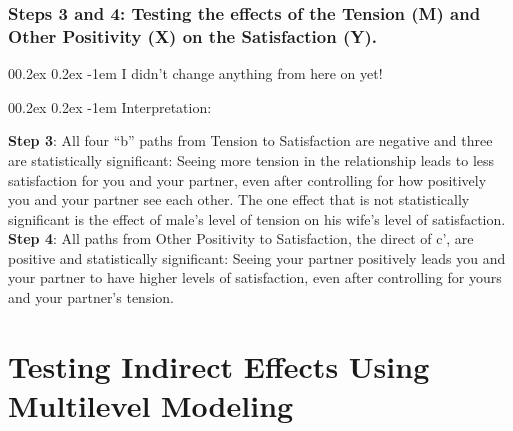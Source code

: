 \documentclass[
  english,
  man,floatsintext]{apa6}
\makeatletter
\let\oldparagraph\paragraph
\renewcommand{\paragraph}[1]{\oldparagraph{#1}\mbox{}}
\renewcommand{\paragraph}{\@startsection{paragraph}{4}{\parindent}%
  {0\baselineskip \@plus 0.2ex \@minus 0.2ex}%
  {-1em}%
  {\normalfont\normalsize\bfseries\itshape\typesectitle}}
\makeatother
\begin{document}
\hypertarget{steps-3-and-4-testing-the-effects-of-the-tension-m-and-other-positivity-x-on-the-satisfaction-y.}{%
\subsubsection{Steps 3 and 4: Testing the effects of the Tension (M) and Other Positivity (X) on the Satisfaction (Y).}\label{steps-3-and-4-testing-the-effects-of-the-tension-m-and-other-positivity-x-on-the-satisfaction-y.}}

\hypertarget{i-didnt-change-anything-from-here-on-yet}{%
\paragraph{I didn't change anything from here on yet!}\label{i-didnt-change-anything-from-here-on-yet}}

\hypertarget{interpretation-1}{%
\paragraph{Interpretation:}\label{interpretation-1}}

\textbf{Step 3}: All four \enquote{b} paths from Tension to Satisfaction are negative and three are statistically significant: Seeing more tension in the relationship leads to less satisfaction for you and your partner, even after controlling for how positively you and your partner see each other. The one effect that is not statistically significant is the effect of male's level of tension on his wife's level of satisfaction.\\
\textbf{Step 4}: All paths from Other Positivity to Satisfaction, the direct of c', are positive and statistically significant: Seeing your partner positively leads you and your partner to have higher levels of satisfaction, even after controlling for yours and your partner's tension.

\hypertarget{testing-indirect-effects-using-multilevel-modeling}{%
\section{Testing Indirect Effects Using Multilevel Modeling}\label{testing-indirect-effects-using-multilevel-modeling}}
\end{document}
